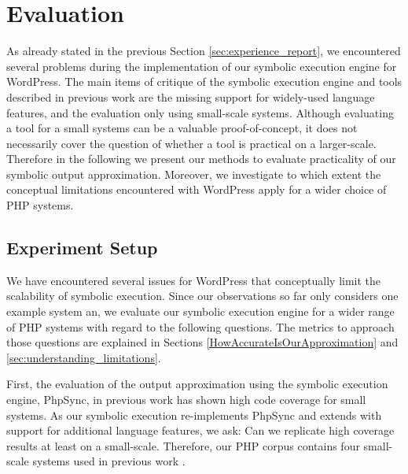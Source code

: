 \documentclass[sigconf]{acmart}
\renewcommand{\sf}[1]{\textsf{#1}}
\begin{document}
\section{Evaluation} \label{sec:evaluation}
As already stated in the previous Section \ref{sec:experience_report}, we
encountered several problems during the implementation of our symbolic
execution engine for \sf{WordPress}. The main items of critique of the symbolic
execution engine and tools described in previous work
\cite{Nguyen:2011:AFH:2190078.2190142,Nguyen:2014:BCG:2635868.2635928,Nguyen:2015:CPS:2786805.2786872,Nguyen:2015:VIS:2819009.2819140}
are the missing support for widely-used language features, and the evaluation
only using small-scale systems. Although evaluating a tool for a small systems
can be a valuable proof-of-concept, it does not necessarily cover the question
of whether a tool is practical on a larger-scale. Therefore in the following we
present our methods to evaluate practicality of our symbolic output
approximation. Moreover, we investigate to which extent the conceptual limitations encountered
with \sf{WordPress} apply for a wider choice of PHP systems.

\subsection{Experiment Setup} \label{sec:experiment_setup}
We have encountered several issues for \sf{WordPress} that conceptually limit
the scalability of symbolic execution. Since our observations so far only considers
one example system an, we evaluate our symbolic execution engine for a wider
range of PHP systems with regard to the following questions. The metrics to
approach those questions are explained in Sections
\ref{HowAccurateIsOurApproximation} and \ref{sec:understanding_limitations}.

First, the evaluation of the output approximation using the symbolic execution
engine, \sf{PhpSync}, in previous work \cite{Nguyen:2014:BCG:2635868.2635928}
has shown high code coverage for small systems. As our symbolic execution
re-implements \sf{PhpSync} and extends with support for additional language
features, we ask: Can  we replicate high coverage results at least on a
small-scale. Therefore, our PHP corpus contains four small-scale systems used
in previous work \cite{Nguyen:2014:BCG:2635868.2635928}.
\end{document}
